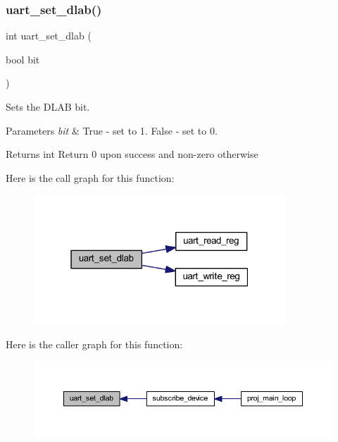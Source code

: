 \subsubsection{\texorpdfstring{uart\+\_\+set\+\_\+dlab()}{uart\_set\_dlab()}}
{\footnotesize\ttfamily int uart\+\_\+set\+\_\+dlab (\begin{DoxyParamCaption}\item[{bool}]{bit }\end{DoxyParamCaption})}



Sets the D\+L\+AB bit. 


\begin{DoxyParams}{Parameters}
{\em bit} & True -\/ set to 1. False -\/ set to 0. \\
\hline
\end{DoxyParams}
\begin{DoxyReturn}{Returns}
int Return 0 upon success and non-\/zero otherwise 
\end{DoxyReturn}
Here is the call graph for this function\+:\nopagebreak
\begin{figure}[H]
\begin{center}
\leavevmode
\includegraphics[width=268pt]{group__uart_ga9ebda6fe7f4118ddcd4e4b527d9e31ef_cgraph}
\end{center}
\end{figure}
Here is the caller graph for this function\+:\nopagebreak
\begin{figure}[H]
\begin{center}
\leavevmode
\includegraphics[width=350pt]{group__uart_ga9ebda6fe7f4118ddcd4e4b527d9e31ef_icgraph}
\end{center}
\end{figure}
\mbox{\label{group__uart_gadad7d5f52c59d4f78daa5b8030b13510}} 
